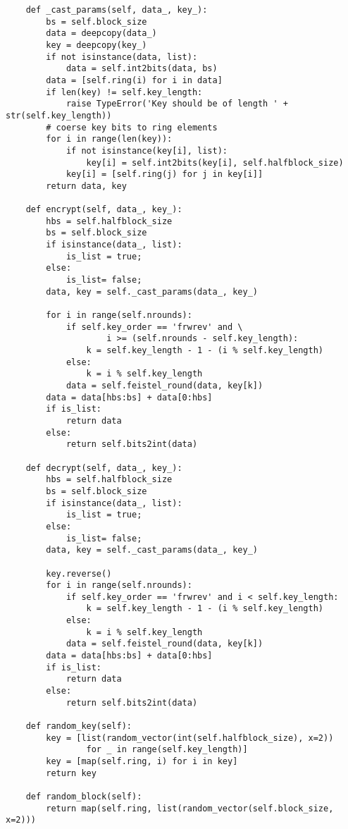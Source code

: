 \begin{lstlisting}
    def _cast_params(self, data_, key_):
        bs = self.block_size
        data = deepcopy(data_)
        key = deepcopy(key_)
        if not isinstance(data, list):
            data = self.int2bits(data, bs)
        data = [self.ring(i) for i in data]
        if len(key) != self.key_length:
            raise TypeError('Key should be of length ' + str(self.key_length))
        # coerse key bits to ring elements
        for i in range(len(key)):
            if not isinstance(key[i], list):
                key[i] = self.int2bits(key[i], self.halfblock_size)
            key[i] = [self.ring(j) for j in key[i]]
        return data, key

    def encrypt(self, data_, key_):
        hbs = self.halfblock_size
        bs = self.block_size
        if isinstance(data_, list):
            is_list = true;
        else:
            is_list= false;
        data, key = self._cast_params(data_, key_)

        for i in range(self.nrounds):
            if self.key_order == 'frwrev' and \
                    i >= (self.nrounds - self.key_length):
                k = self.key_length - 1 - (i % self.key_length)
            else:
                k = i % self.key_length
            data = self.feistel_round(data, key[k])
        data = data[hbs:bs] + data[0:hbs]
        if is_list:
            return data
        else:
            return self.bits2int(data)

    def decrypt(self, data_, key_):
        hbs = self.halfblock_size
        bs = self.block_size
        if isinstance(data_, list):
            is_list = true;
        else:
            is_list= false;
        data, key = self._cast_params(data_, key_)

        key.reverse()
        for i in range(self.nrounds):
            if self.key_order == 'frwrev' and i < self.key_length:
                k = self.key_length - 1 - (i % self.key_length)
            else:
                k = i % self.key_length
            data = self.feistel_round(data, key[k])
        data = data[hbs:bs] + data[0:hbs]
        if is_list:
            return data
        else:
            return self.bits2int(data)

    def random_key(self):
        key = [list(random_vector(int(self.halfblock_size), x=2)) 
                for _ in range(self.key_length)]
        key = [map(self.ring, i) for i in key]
        return key

    def random_block(self):
        return map(self.ring, list(random_vector(self.block_size, x=2)))


\end{lstlisting}
